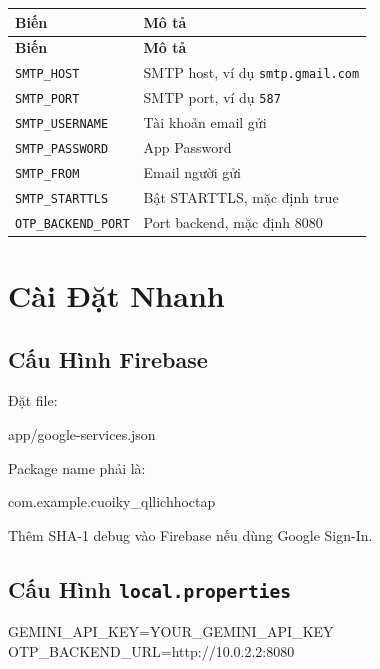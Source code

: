 \documentclass[12pt,a4paper]{report}
\begin{document}
\begin{longtable}{|>{\raggedright\arraybackslash}p{}|>{\raggedright\arraybackslash}p{}|}
\hline
\textbf{Biến} & \textbf{Mô tả} \\ \hline
\endfirsthead
\hline
\textbf{Biến} & \textbf{Mô tả} \\ \hline
\endhead
\texttt{SMTP\_HOST} & SMTP host, ví dụ \texttt{smtp.gmail.com} \\ \hline
\texttt{SMTP\_PORT} & SMTP port, ví dụ \texttt{587} \\ \hline
\texttt{SMTP\_USERNAME} & Tài khoản email gửi \\ \hline
\texttt{SMTP\_PASSWORD} & App Password \\ \hline
\texttt{SMTP\_FROM} & Email người gửi \\ \hline
\texttt{SMTP\_STARTTLS} & Bật STARTTLS, mặc định true \\ \hline
\texttt{OTP\_BACKEND\_PORT} & Port backend, mặc định 8080 \\ \hline
\end{longtable}

\section{Cài Đặt Nhanh}

\subsection{Cấu Hình Firebase}

Đặt file:

\begin{CodeBlock}
app/google-services.json
\end{CodeBlock}

Package name phải là:

\begin{CodeBlock}
com.example.cuoiky_qllichhoctap
\end{CodeBlock}

Thêm SHA-1 debug vào Firebase nếu dùng Google Sign-In.

\subsection{Cấu Hình \texttt{local.properties}}

\begin{CodeBlock}
GEMINI_API_KEY=YOUR_GEMINI_API_KEY
OTP_BACKEND_URL=http://10.0.2.2:8080
\end{CodeBlock}
\end{document}
